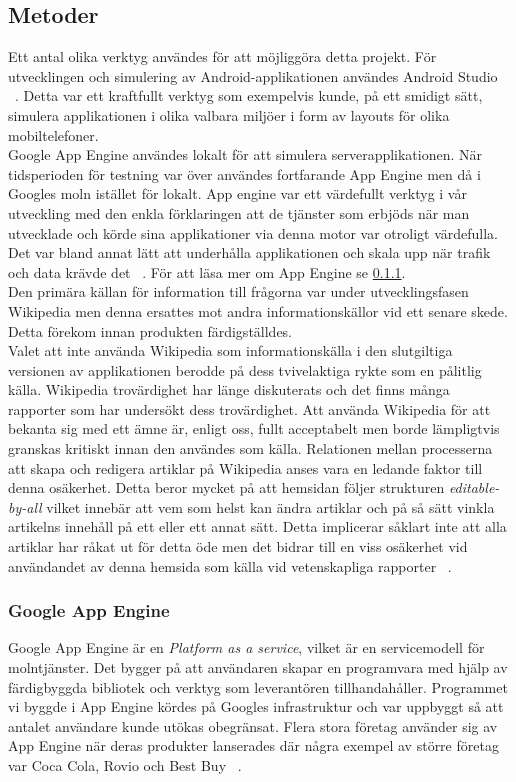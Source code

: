 \documentclass[a4paper, 11pt]{article}
\begin{document}
\subsection{Metoder}
Ett antal olika verktyg användes för att möjliggöra detta projekt. För utvecklingen och simulering av Android-applikationen användes Android Studio ~\cite{androidstudio}. Detta var ett kraftfullt verktyg som exempelvis kunde, på ett smidigt sätt, simulera applikationen i olika valbara miljöer i form av layouts för olika mobiltelefoner.\\
Google App Engine användes lokalt för att simulera serverapplikationen. När tidsperioden för testning var över användes fortfarande App Engine men då i Googles moln istället för lokalt. App engine var ett värdefullt verktyg i vår utveckling med den enkla förklaringen att de tjänster som erbjöds när man utvecklade och körde sina applikationer via denna motor var otroligt värdefulla. Det var bland annat lätt att underhålla applikationen och skala upp när trafik och data krävde det ~\cite{googleappengine}. För att läsa mer om App Engine se \ref{Google App Engine}. \\
Den primära källan för information till frågorna var under utvecklingsfasen Wikipedia men denna ersattes mot andra informationskällor vid ett senare skede. Detta förekom innan produkten färdigställdes.\\ 
Valet att inte använda Wikipedia som informationskälla i den slutgiltiga versionen av applikationen berodde på dess tvivelaktiga rykte som en pålitlig källa. Wikipedia trovärdighet har länge diskuterats och det finns många rapporter som har undersökt dess trovärdighet. Att använda Wikipedia för att bekanta sig med ett ämne är, enligt oss, fullt acceptabelt men borde lämpligtvis granskas kritiskt innan den användes som källa. Relationen mellan processerna att skapa och redigera artiklar på Wikipedia anses vara en ledande faktor till denna osäkerhet. Detta beror mycket på att hemsidan följer strukturen \textit{editable-by-all} vilket innebär att vem som helst kan ändra artiklar och på så sätt vinkla artikelns innehåll på ett eller ett annat sätt. Detta implicerar såklart inte att alla artiklar har råkat ut för detta öde men det bidrar till en viss osäkerhet vid användandet av denna hemsida som källa vid vetenskapliga rapporter ~\cite[sid 27--34]{wikipediacred}.

\subsubsection{Google App Engine} \label{Google App Engine}
Google App Engine är en \textit{Platform as a service}, vilket är en servicemodell för molntjänster. Det bygger på att användaren skapar en programvara med hjälp av färdigbyggda bibliotek och verktyg som leverantören tillhandahåller. Programmet vi byggde i App Engine kördes på Googles infrastruktur och var uppbyggt så att antalet användare kunde utökas obegränsat. Flera stora företag använder sig av App Engine när deras produkter lanserades där några exempel av större företag var Coca Cola, Rovio och Best Buy ~\cite{googleappenginecustomers}. 
\end{document}
